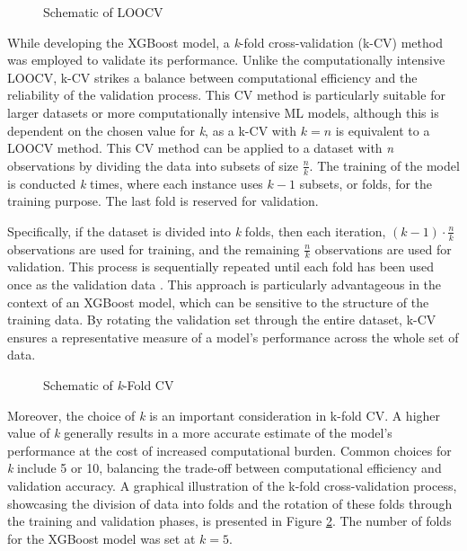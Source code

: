 \begin{figure}[h]
        \centering
        
        \caption{Schematic of LOOCV}
        \label{fig:loocv}
    \end{figure} \newpage

While developing the XGBoost model, a \textit{k}-fold cross-validation (k-CV) method was employed to validate its performance. Unlike the computationally intensive LOOCV, k-CV strikes a balance between computational efficiency and the reliability of the validation process. This CV method is particularly suitable for larger datasets or more computationally intensive ML models, although this is dependent on the chosen value for \textit{k}, as a k-CV with \(k = n\) is equivalent to a LOOCV method. This CV method can be applied to a dataset with \textit{n} observations by dividing the data into subsets of size \(\frac{n}{k}\). The training of the model is conducted \textit{k} times, where each instance uses \(k-1\) subsets, or folds, for the training purpose. The last fold is reserved for validation.

Specifically, if the dataset is divided into \textit{k} folds, then each iteration, \((k-1)\cdot \frac{n}{k}\) observations are used for training, and the remaining \(\frac{n}{k}\) observations are used for validation. This process is sequentially repeated until each fold has been used once as the validation data \parencite{witten2013introduction}. This approach is particularly advantageous in the context of an XGBoost model, which can be sensitive to the structure of the training data. By rotating the validation set through the entire dataset, k-CV ensures a representative measure of a model's performance across the whole set of data.

\begin{figure}[H]
        \centering
        
        \caption{Schematic of \textit{k}-Fold CV}
        \label{fig:kfold}
    \end{figure}

Moreover, the choice of \textit{k} is an important consideration in k-fold CV. A higher value of 
\textit{k} generally results in a more accurate estimate of the model's performance at the cost of increased computational burden. Common choices for \textit{k} include 5 or 10, balancing the trade-off between computational efficiency and validation accuracy. A graphical illustration of the k-fold cross-validation process, showcasing the division of data into folds and the rotation of these folds through the training and validation phases, is presented in Figure \ref{fig:kfold}. The number of folds for the XGBoost model was set at \(k = 5\).


